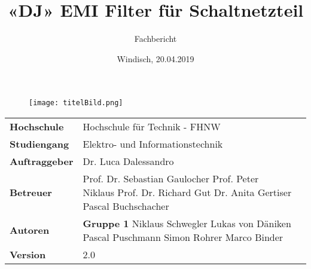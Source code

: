 \documentclass[final]{fhnwreport}       %
\title{«DJ» EMI Filter für Schaltnetzteil}          			%
\author{Fachbericht}  		%
\date{Windisch, 20.04.2019}             		%
\begin{document}
\maketitle

\vspace*{-1cm}						    %
\vfill
\begin{figure}[H]
\centering
\texttt{[image: titelBild.png]}
\end{figure}
\vfill

{
\renewcommand\arraystretch{2}
\begin{center}
\begin{tabular}{ >{\bf} l p{10cm} l }
Hochschule&Hochschule für Technik - FHNW\\
Studiengang&Elektro- und Informationstechnik\\
Auftraggeber&Dr. Luca Dalessandro\\
Betreuer&Prof. Dr. Sebastian Gaulocher \newline Prof. Peter Niklaus \newline Prof. Dr. Richard Gut \newline  Dr. Anita Gertiser \newline Pascal Buchschacher \\
Autoren&\textbf{Gruppe 1} \newline Niklaus Schwegler \newline Lukas von Däniken \newline Pascal Puschmann  \newline Simon Rohrer \newline Marco Binder\\
Version&2.0 %
\end{tabular}
\end{center}
}

\clearpage

\thispagestyle{empty}
			
\tableofcontents
\clearpage






\end{document}
